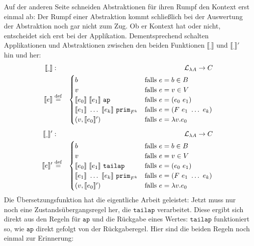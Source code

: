 Auf der anderen Seite schneiden Abstraktionen für ihren Rumpf den
Kontext erst einmal ab: Der Rumpf einer Abstraktion kommt schließlich bei der
Auswertung der Abstraktion noch gar nicht zum Zug.  Ob er Kontext hat
oder nicht, entscheidet sich erst bei der Applikation.
Dementsprechend schalten Applikationen und Abstraktionen zwischen den
beiden Funktionen $\llbracket \underline{~} \rrbracket$ und
$\llbracket \underline{~} \rrbracket'$ hin und her:
%
\begin{eqnarray*}
  \llbracket \underline{~} \rrbracket &:& \mathcal{L}_{\lambda{}A} \rightarrow C\\
  \llbracket e \rrbracket &\stackrel{\rm def}{=}&
  \begin{cases}
    b & \textrm{falls $e = b \in B$}\\
    v & \textrm{falls $e = v \in V$}\\
    \llbracket e_0\rrbracket~\llbracket e_1\rrbracket~\mathtt{ap}
    & \textrm{falls $e = (e_0~e_1)$}\\
    \llbracket e_1\rrbracket~\ldots~\llbracket e_k\rrbracket~\mathtt{prim}_{F^k}
    & \textrm{falls $e = (F~e_1~\ldots~e_k)$}\\
    (v, \llbracket e_0\rrbracket') & \textrm{falls $e = \lambda v.e_0$}
  \end{cases}\\[1ex]
  \llbracket \underline{~} \rrbracket' &:& \mathcal{L}_{\lambda{}A} \rightarrow C\\
  \llbracket e \rrbracket' &\stackrel{\rm def}{=}&
  \begin{cases}
    b & \textrm{falls $e = b \in B$}\\
    v & \textrm{falls $e = v \in V$}\\
    \llbracket e_0\rrbracket~\llbracket e_1\rrbracket~\mathtt{tailap}
    & \textrm{falls $e = (e_0~e_1)$}\\
    \llbracket e_1\rrbracket~\ldots~\llbracket e_k\rrbracket~\mathtt{prim}_{F^k}
    & \textrm{falls $e = (F~e_1~\ldots~e_k)$}\\
    (v, \llbracket e_0\rrbracket') & \textrm{falls $e = \lambda v.e_0$}
  \end{cases}
\end{eqnarray*}
%
Die Übersetzungsfunktion hat die eigentliche Arbeit geleistet: Jetzt
muss nur noch eine Zustandsübergangsregel her, die $\mathtt{tailap}$
verarbeitet.  Diese ergibt sich direkt aus den Regeln für
$\mathtt{ap}$ und die Rückgabe eines Wertes:  $\mathtt{tailap}$
funktioniert so, wie $\mathtt{ap}$ direkt gefolgt von der
Rückgaberegel.  Hier sind die beiden Regeln noch einmal zur Erinnerung:
